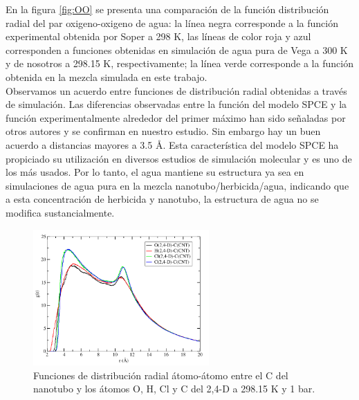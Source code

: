 \newpage

En la figura \ref{fig:OO} se presenta una comparación de la función distribución radial del par oxigeno-oxigeno de agua: la línea negra corresponde a la función experimental obtenida por Soper \cite{Soper2013} a 298 K, las líneas de color roja y azul corresponden a funciones obtenidas en simulación de agua pura de Vega \cite{vega2005} a 300 K y de nosotros a 298.15 K, respectivamente; la línea verde corresponde a la función obtenida en la mezcla simulada en este trabajo.\\

Observamos un acuerdo entre funciones de distribución radial obtenidas a través de simulación. Las diferencias observadas entre la función del modelo SPCE y la función experimentalmente alrededor del primer máximo han sido señaladas por otros autores y se confirman en nuestro estudio. Sin embargo hay un buen acuerdo a distancias mayores a 3.5 \AA. Esta característica del modelo SPCE ha propiciado su utilización en diversos estudios de simulación molecular y es uno de los más usados. Por lo tanto, el agua mantiene su estructura ya sea en simulaciones de agua pura en la mezcla nanotubo/herbicida/agua, indicando que a esta concentración de herbicida y nanotubo, la estructura de agua no se modifica sustancialmente.\\

\begin{figure}[!hbt]
    \centering
    \includegraphics[width=0.6\textwidth,keepaspectratio=true]{resultados/gr_24D_CNT_298_15_atom_atom.png}
    \caption{Funciones de distribución radial átomo-átomo entre el C del nanotubo y los átomos O, H, Cl y C del 2,4-D a 298.15 K y 1 bar.}
    \label{fig:24D_CNT_298_15_atom_atom}
\end{figure}

